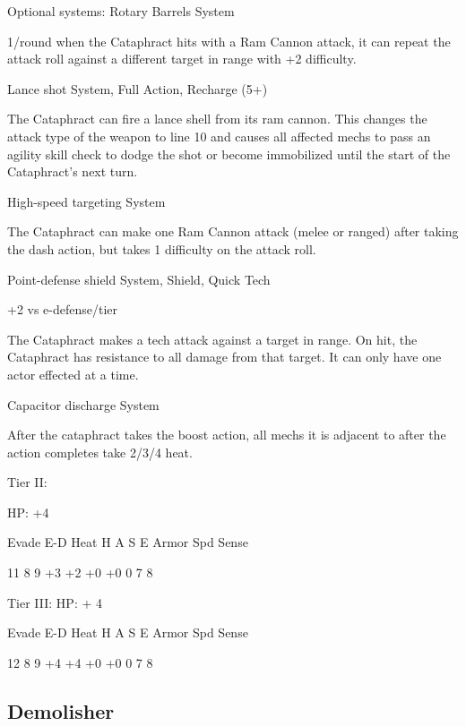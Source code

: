 Optional systems:  
Rotary Barrels  
System
 
1/round when the Cataphract hits with a Ram Cannon attack, it can repeat the attack roll against  
a different target in range with +2 difficulty.
 

                                                                                                          


Lance shot  
System, Full Action, Recharge (5+)
 
The Cataphract can fire a lance shell from its ram cannon. This changes the attack type of the  
weapon to line 10 and causes all affected mechs to pass an agility skill check to dodge the shot  
or become immobilized until the start of the Cataphract’s next turn.
 

High-speed targeting  
System
 
The Cataphract can make one Ram Cannon attack (melee or ranged) after taking the dash  
action, but takes 1 difficulty on the attack roll.
 

Point-defense shield  
System, Shield, Quick Tech
 
+2 vs e-defense/tier
 
The Cataphract makes a tech attack against a target in range. On hit, the Cataphract has  
resistance to all damage from that target. It can only have one actor effected at a time.
 

Capacitor discharge  
System
 
After the cataphract takes the boost action, all mechs it is adjacent to after the action completes  
take 2/3/4 heat.
 

Tier II:
 
HP: +4
 

          Evade    E-D    Heat     H    A     S     E       Armor        Spd      Sense 

          11       8      9        +3   +2    +0    +0      0            7        8 

Tier III:  
HP: + 4
 

          Evade    E-D    Heat     H    A     S     E       Armor        Spd      Sense 

          12       8      9        +4   +4    +0    +0      0            7        8 

                                                                                                                
\subsection{Demolisher}

